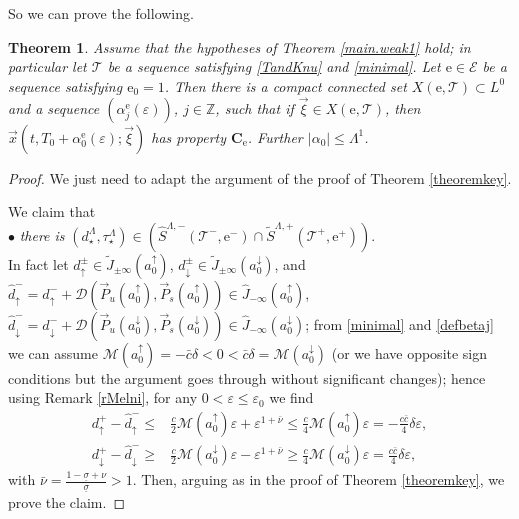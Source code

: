 \documentclass[10pt]{article}
\numberwithin{equation}{section}
\def\al{\alpha}
\def\ep{\varepsilon}
\def\Z{{\mathbb Z}}
\def\ee{{\mathrm e}}
\def\EE{{\mathcal E}}
\def\MM{{\mathcal M}}
\def\TT{{\mathcal T}}
\def\DDD{\mathscr{D}}
\def\aup{a^{\uparrow}}
\def\adown{a^{\downarrow}}
\def\l1{\Lambda^{1}}
\def\P{\vec{P}}
\def\xxi{\vec{\xi}}
\def\x{\vec{x}}
\newcommand\bs[1]{{\boldsymbol{#1}}}
\newtheorem{theorem}{Theorem}[section]
\theoremstyle{definition}
\theoremstyle{remark}
\begin{document}
So we can prove the following.
\begin{theorem}\label{theoremkeybis}
  Assume that  the hypotheses of Theorem \ref{main.weak1} hold;   in particular let $\TT$ be a sequence satisfying \eqref{TandKnu}
  and \eqref{minimal}.
   Let $\ee \in \EE$ be a sequence satisfying
   $\ee_0=1$. Then there is a compact  connected  set $X(\ee, \TT)\subset L^0$  and a sequence $(\al_j^{\ee}(\ep))$, $j \in
   \Z$,
   such that if $\xxi \in X(\ee, \TT)$,
   then $\x(t,T_0+\al_0^\ee(\ep); \xxi)$ has property  $\bs{C_{\ee}}$.  Further $|\alpha_0| \le \l1$.
\end{theorem}
\begin{proof}
  We just need to adapt the argument of the proof of Theorem \ref{theoremkey}.





  We claim that
\\ $\bullet$ \emph{there is}
$(d_{\star}^{\Lambda},\tau_{\star}^{\Lambda}) \in (\hat{S}^{\Lambda,-}(\TT^-, \ee^-) \cap  \tilde{S}^{\Lambda,+}(\TT^+, \ee^+))$.
\\
In fact let
$d^{\pm}_{\uparrow} \in \tilde{J}_{\pm\infty}(\aup_0)$, $d^{\pm}_{\downarrow} \in \tilde{J}_{\pm\infty}(\adown_0)$,
 and  $\hat{d}^-_{\uparrow}= d^-_{\uparrow}+ \DDD(\P_u(\aup_0), \P_s(\aup_0)) \in \hat{J}_{-\infty}(\aup_0)$,
 $\hat{d}^-_{\downarrow}= d^-_{\downarrow}+ \DDD(\P_u(\adown_0), \P_s(\adown_0)) \in \hat{J}_{-\infty}(\adown_0)$;
from \eqref{minimal} and \eqref{defbetaj} we can assume  $\MM(\aup_0)=-\bar{c} \delta<0<\bar{c} \delta =\MM(\adown_0)$
(or we have opposite sign conditions but the argument goes through without significant changes);
hence using Remark \ref{rMelni}, for any $0<\ep \le \ep_0$ we find
\begin{equation}\label{d+id-ibis}
  \begin{split}
     d^{+}_{\uparrow}-\hat{d}^{-}_{\uparrow} \le  &   \frac{c}{2} \MM(\aup_0) \ep +\ep^{1+\bar{\nu} } \le    \frac{c}{4} \MM(\aup_0) \ep =  -
     \frac{c\bar{c}}{4} \delta \ep , \\
     d^{+}_{\downarrow}-\hat{d}^{-}_{\downarrow}\ge  &  \frac{c}{2} \MM(\adown_0)\ep  -\ep^{1+\bar{\nu} } \ge   \frac{c}{4} \MM(\adown_0) \ep
     =
     \frac{c\bar{c}}{4}  \delta\ep ,
  \end{split}
\end{equation}
 with $\bar{\nu}= \frac{1-\underline{\sigma}+\nu}{\underline{\sigma}}>1$.
Then, arguing as in the proof of Theorem \ref{theoremkey}, we prove the claim.


\end{proof}
\end{document}
